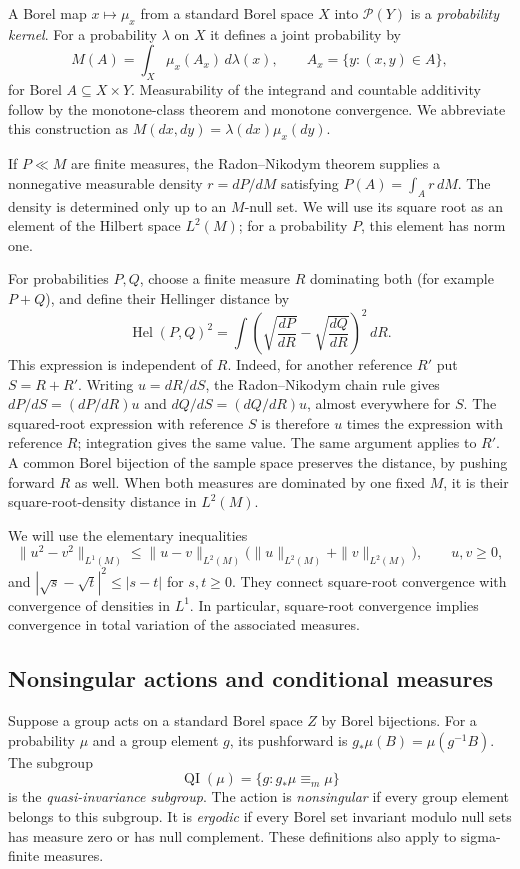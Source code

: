 \documentclass[11pt]{article}
\theoremstyle{definition}
\newcommand{\Prob}{\mathcal P}
\newcommand{\ME}{\mathrel{\equiv_m}}
\newcommand{\Hel}{\operatorname{Hel}}
\newcommand{\QI}{\operatorname{QI}}
\begin{document}
A Borel map $x\mapsto\mu_x$ from a standard Borel space $X$ into
$\Prob(Y)$ is a \emph{probability kernel}. For a probability $\lambda$
on $X$ it defines a joint probability by
\[
 M(A)=\int_X \mu_x(A_x)\,d\lambda(x),\qquad
 A_x=\{y:(x,y)\in A\},
\]
for Borel $A\subseteq X\times Y$. Measurability of the integrand and
countable additivity follow by the monotone-class theorem and monotone
convergence. We abbreviate this construction as
$M(dx,dy)=\lambda(dx)\mu_x(dy)$.

If $P\ll M$ are finite measures, the Radon--Nikodym theorem supplies a
nonnegative measurable density $r=dP/dM$ satisfying
$P(A)=\int_A r\,dM$. The density is determined only up to an $M$-null
set. We will use its square root as an element of the Hilbert space
$L^2(M)$; for a probability $P$, this element has norm one.

For probabilities $P,Q$, choose a finite measure $R$ dominating both
(for example $P+Q$), and define their Hellinger distance by
\[
 \Hel(P,Q)^2
 =\int\left(\sqrt{\frac{dP}{dR}}
             -\sqrt{\frac{dQ}{dR}}\right)^2\,dR.
\]
This expression is independent of $R$. Indeed, for another reference $R'$
put $S=R+R'$. Writing $u=dR/dS$, the Radon--Nikodym chain rule gives
$dP/dS=(dP/dR)u$ and $dQ/dS=(dQ/dR)u$, almost everywhere for $S$.
The squared-root expression with reference $S$ is therefore $u$ times
the expression with reference $R$; integration gives the same value.
The same argument applies to $R'$. A common Borel bijection of the sample space preserves the
distance, by pushing forward $R$ as well. When both measures are dominated
by one fixed $M$, it is their square-root-density distance in $L^2(M)$.

We will use the elementary inequalities
\[
 \|u^2-v^2\|_{L^1(M)}
 \le \|u-v\|_{L^2(M)}\bigl(\|u\|_{L^2(M)}+\|v\|_{L^2(M)}\bigr),
 \qquad u,v\ge0,
\]
and $|\sqrt{s}-\sqrt{t}|^2\le|s-t|$ for $s,t\ge0$.
They connect square-root convergence with convergence of densities in
$L^1$. In particular, square-root convergence implies convergence in
total variation of the associated measures.

\subsection{Nonsingular actions and conditional measures}
Suppose a group acts on a standard Borel space $Z$ by Borel bijections.
For a probability $\mu$ and a group element $g$, its pushforward is
$g_*\mu(B)=\mu(g^{-1}B)$. The subgroup
\[
 \QI(\mu)=\{g:g_*\mu\ME\mu\}
\]
is the \emph{quasi-invariance subgroup}. The action is \emph{nonsingular}
if every group element belongs to this subgroup. It is \emph{ergodic}
if every Borel set invariant modulo null sets has measure zero or has
null complement. These definitions also apply to sigma-finite measures.
\end{document}
